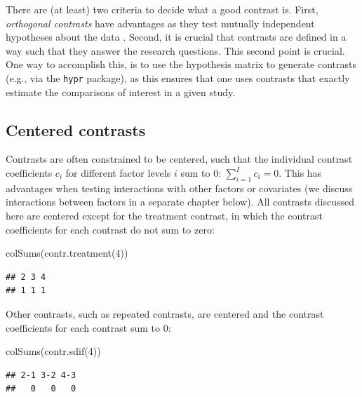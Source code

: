 \documentclass[
  12pt,
]{krantz}
\newenvironment{Shaded}{\begin{snugshade}}{\end{snugshade}}
\newcommand{\DecValTok}[1]{\textcolor[rgb]{0.00,0.00,0.81}{#1}}
\newcommand{\FunctionTok}[1]{\textcolor[rgb]{0.00,0.00,0.00}{#1}}
\newcommand{\NormalTok}[1]{#1}
\theoremstyle{definition}
\theoremstyle{definition}
\theoremstyle{definition}
\theoremstyle{definition}
\theoremstyle{remark}
\begin{document}
There are (at least) two criteria to decide what a good contrast is. First, \textit{orthogonal contrasts} have advantages as they test mutually independent hypotheses about the data \citep[see][section 6.2.5, p.~91 for a detailed explanation of orthogonality]{dobson2011introduction}. Second, it is crucial that contrasts are defined in a way such that they answer the research questions. This second point is crucial. One way to accomplish this, is to use the hypothesis matrix to generate contrasts (e.g., via the \texttt{hypr} package), as this ensures that one uses contrasts that exactly estimate the comparisons of interest in a given study.

\hypertarget{centered-contrasts}{%
\subsection{Centered contrasts}\label{centered-contrasts}}

Contrasts are often constrained to be centered, such that the individual contrast coefficients \(c_i\) for different factor levels \(i\) sum to \(0\): \(\sum_{i=1}^I c_i = 0\). This has advantages when testing interactions with other factors or covariates (we discuss interactions between factors in a separate chapter below).
All contrasts discussed here are centered except for the treatment contrast, in which the contrast coefficients for each contrast do not sum to zero:

\begin{Shaded}
\begin{Highlighting}[]
\FunctionTok{colSums}\NormalTok{(}\FunctionTok{contr.treatment}\NormalTok{(}\DecValTok{4}\NormalTok{))}
\end{Highlighting}
\end{Shaded}

\begin{verbatim}
## 2 3 4 
## 1 1 1
\end{verbatim}

Other contrasts, such as repeated contrasts, are centered and the contrast coefficients for each contrast sum to \(0\):

\begin{Shaded}
\begin{Highlighting}[]
\FunctionTok{colSums}\NormalTok{(}\FunctionTok{contr.sdif}\NormalTok{(}\DecValTok{4}\NormalTok{))}
\end{Highlighting}
\end{Shaded}

\begin{verbatim}
## 2-1 3-2 4-3 
##   0   0   0
\end{verbatim}
\end{document}
